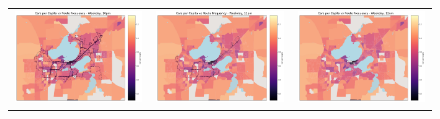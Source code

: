 \documentclass[letter]{article}
\begin{document}
\begin{figure}
\begin{center}
\begin{tabular}{ c c c }
        \includegraphics[width=60mm]{CarOwnershipVSfrequency10pm.png}   & \includegraphics[width=60mm]{CarOwnershipVSfrequency11pm.png}  & \includegraphics[width=60mm]{CarOwnershipVSfrequency12am.png}  \\
         
  \end{tabular}
\end{center}
\end{figure}
\end{document}
